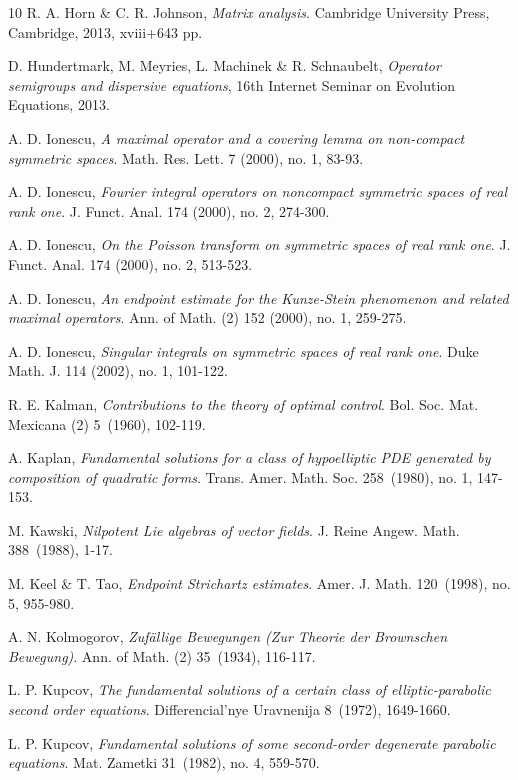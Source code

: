 \documentclass[11pt,letter]{amsart}
\numberwithin{equation}{section}
\numberwithin{equation}{section}
\begin{document}
\begin{thebibliography}{10}
R. A. Horn \& C. R. Johnson, \emph{Matrix analysis}.
Cambridge University Press, Cambridge, 2013, xviii+643 pp.

D. Hundertmark, M. Meyries, L. Machinek \& R. Schnaubelt, \emph{Operator semigroups and dispersive equations}, 16th Internet Seminar on Evolution Equations, 2013.

A. D. Ionescu, \emph{A maximal operator and a covering lemma on non-compact symmetric spaces}.
Math. Res. Lett. 7 (2000), no. 1, 83-93.

A. D. Ionescu, \emph{Fourier integral operators on noncompact symmetric spaces of real rank one}.
J. Funct. Anal. 174 (2000), no. 2, 274-300.

A. D. Ionescu, \emph{On the Poisson transform on symmetric spaces of real rank one}.
J. Funct. Anal. 174 (2000), no. 2, 513-523.

A. D. Ionescu, \emph{An endpoint estimate for the Kunze-Stein phenomenon and related maximal operators}.
Ann. of Math. (2) 152 (2000), no. 1, 259-275.


A. D. Ionescu, \emph{Singular integrals on symmetric spaces of real rank one}.
Duke Math. J. 114 (2002), no. 1, 101-122.


 

R. E. Kalman, \emph{Contributions to the theory of optimal control}.
Bol. Soc. Mat. Mexicana (2) 5~(1960), 102-119.

A. Kaplan, \emph{Fundamental solutions for a class of hypoelliptic PDE generated by composition of quadratic forms}. Trans. Amer. Math. Soc. 258~(1980), no. 1, 147-153.


M. Kawski, \emph{Nilpotent Lie algebras of vector fields}.
J. Reine Angew. Math. 388~(1988), 1-17.

M. Keel \& T. Tao, \emph{Endpoint Strichartz estimates}.
Amer. J. Math. 120~(1998), no. 5, 955-980.

A. N. Kolmogorov,  
\textit{Zuf\"allige Bewegungen (Zur Theorie der Brownschen Bewegung)}. Ann. of Math. (2) 35~(1934), 116-117.

L. P. Kupcov, \emph{The fundamental solutions of a certain class of elliptic-parabolic second order equations}.
Differencial'nye Uravnenija 8~(1972), 1649-1660.

L. P. Kupcov, \emph{Fundamental solutions of some second-order degenerate parabolic equations}.
Mat. Zametki 31~(1982), no. 4, 559-570.


\end{thebibliography}
\end{document}
